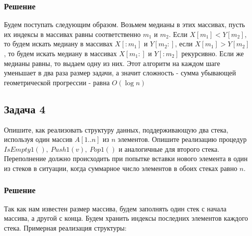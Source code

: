 \documentclass[a4letter,12pt]{article}
\begin{document}
	\subsubsection*{Решение}
	Будем поступать следующим образом. Возьмем медианы в этих массивах, пусть их индексы в массивах равны соответственно $m_1$ и $m_2$. Если $X[m_1] < Y[m_2]$, то будем искать медиану в массивах $X[:m_1]$ и $Y[m_2:]$, если $X[m_1] > Y[m_2]$, то будем искать медиану в массивах $X[m_1:]$ и $Y[:m_2]$ рекурсивно. Если же медианы равны, то выдаем одну из них. Этот алгоритм на каждом шаге уменьшает в два раза размер задачи, а значит сложность - сумма убывающей геометрической прогрессии - равна $O(\log n)$
	
	\subsection*{Задача 4}
	Опишите, как реализовать структуру данных, поддерживающую два стека, используя один массив $A[1..n]$ из $n$ элементов. Опишите реализацию процедур $IsEmpty1(), \ Push1(v), \ Pop1()$ и аналогичные для второго стека. Переполнение должно происходить при попытке вставки нового элемента в один из стеков в ситуации, когда суммарное число элементов в обоих стеках равно $n$.
	
	\subsubsection*{Решение}
	
	Так как нам известен размер массива, будем заполнять один стек с начала массива, а другой с конца. Будем хранить индексы последних элементов каждого стека. Примерная реализация структуры:
	
\end{document}
